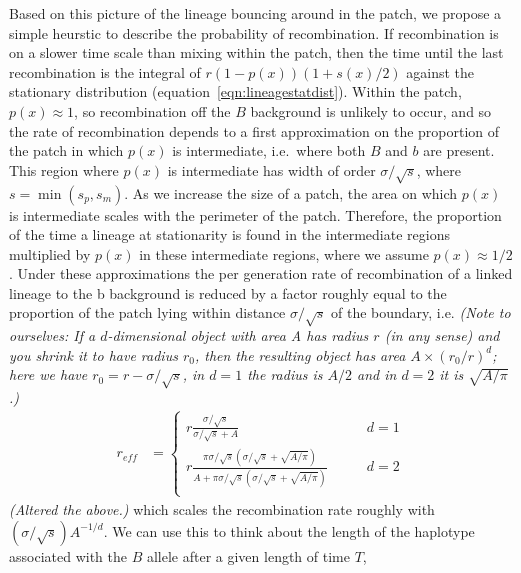 \documentclass{article}
\newcommand{\gc}[1]{{\it\color{green}(#1)} }
\newcommand{\plr}[1]{{\it\color{blue}(#1)}}
\begin{document}
Based on this picture of
the lineage bouncing around in the patch,
we propose a simple heurstic to describe the probability of recombination. 
If recombination is on a slower time scale than mixing within the patch,
then the time until the last recombination is the integral of $r (1-p(x)) (1+s(x)/2)$ 
against the stationary distribution (equation~\ref{eqn:lineagestatdist}).
Within the patch, $p(x) \approx 1$,
so recombination off the $B$ background is unlikely to occur,
and so the rate of recombination depends to a first approximation 
on the proportion of the patch in which $p(x)$ is intermediate,
i.e.\ where both $B$ and $b$ are present.
This region where $p(x)$ is intermediate has width of order $\sigma/\sqrt{s}$, where $s = \min(s_p,s_m)$.
As we increase the size of a patch, the area on which $p(x)$ is intermediate scales with the perimeter of the patch.
Therefore, the proportion of the time a lineage at stationarity is found in the intermediate regions
multiplied by $p(x)$ in these intermediate regions, where we assume
$p(x) \approx 1/2$. Under these approximations the per generation rate of
recombination of a linked lineage to the b background is
reduced by a factor roughly equal to the proportion of the patch lying within distance $\sigma/\sqrt{s}$ of the boundary,
i.e.
\plr{Note to ourselves: If a $d$-dimensional object with area A has radius $r$ (in any sense)
and you shrink it to have radius $r_0$,
then the resulting object has area $A \times (r_0/r)^d$;
here we have $r_0 = r - \sigma/\sqrt{s}$,
in $d=1$ the radius is $A/2$ and in $d=2$ it is $\sqrt{A/\pi}$.}
\begin{align}
r_{eff} &=
    \begin{cases}
    r \frac{ \sigma /\sqrt{s} }{ \sigma/\sqrt{s} + A }    \qquad & d=1 \\
   r \frac{\pi  \sigma /\sqrt{s}  \left( \sigma /\sqrt{s}+
  \sqrt{A/\pi} \right)}{A+\pi \sigma/\sqrt{s} \left( \sigma/\sqrt{s} +
  \sqrt{A/\pi} \right) }    \qquad & d=2 \\  
\end{cases}
\label{eqn:rate-rec-in-patch}   %
\end{align}
\gc{Altered the above.}
which scales the recombination rate roughly with $(\sigma/\sqrt{s})A^{-1/d}$.
We can use this to think about the length of the haplotype
associated with the $B$ allele after a given length of time $T$,
\end{document}
